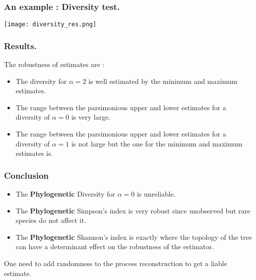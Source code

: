 \documentclass[10pt]{beamer}
\begin{document}
\begin{frame}

\frametitle{An example : Diversity test.}
	\begin{center}

       \texttt{[image: diversity\_res.png]}
	\end{center}
\end{frame}


\begin{frame}

\frametitle{Results.}
The robustness of estimates are : \\

	\begin{itemize}
	\item<1> The diversity for $\alpha=2$ is well estimated by the minimum and maximum estimates.
	\item<1> The range between the parsimonious upper and lower estimates for a diversity of $\alpha=0$ is very large.
	\item<1> The range between the parsimonious upper and lower estimates for a diversity of $\alpha=1$ is not large but the one for the minimum and maximum estimates is.
	\end{itemize}

\end{frame}


\begin{frame}[cc]
\frametitle{Conclusion}

	\begin{itemize}
	\item<1> The \textbf{Phylogenetic} Diversity for $\alpha=0$ is unreliable.
	\item<1> The \textbf{Phylogenetic} Simpson's index is very robust since unobserved but rare species do not affect it.
	\item<1> The \textbf{Phylogenetic} Shannon's index is exactly where the topology of the tree can have a determinant effect on the robustness of the estimator.
	\end{itemize}
	
One need to add randomness to the process reconstruction to get a liable estimate.
	
	
\end{frame}
\end{document}

